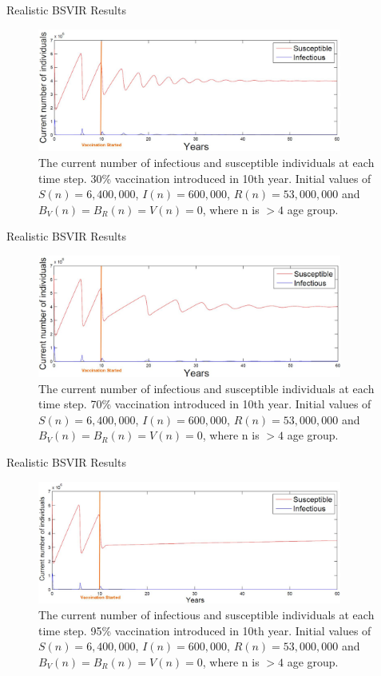 \documentclass{beamer}
\begin{document}
\begin{frame} {Realistic BSVIR} {Results}
\begin{figure}
\centering
\includegraphics[width=100mm]{figrealisticbsvir30.jpg}
\caption{The current number of infectious and susceptible individuals at each time step. 30\% vaccination introduced in 10th year. Initial values of $S\left( n \right) =6,400,000$, $I\left( n \right) =600,000$, $R\left( n \right) =53,000,000$ and $B_V\left( n \right) =B_R\left( n \right) =V\left( n \right) =0$, where n is $>4$ age group.}
\end{figure}
\end{frame}

\begin{frame} {Realistic BSVIR} {Results}
\begin{figure}
\centering
\includegraphics[width=100mm]{figrealisticbsvir70.jpg}
\caption{The current number of infectious and susceptible individuals at each time step. 70\% vaccination introduced in 10th year. Initial values of $S\left( n \right) =6,400,000$, $I\left( n \right) =600,000$, $R\left( n \right) =53,000,000$ and $B_V\left( n \right) =B_R\left( n \right) =V\left( n \right) =0$, where n is $>4$ age group.}
\end{figure}
\end{frame}

\begin{frame} {Realistic BSVIR} {Results}
\begin{figure}
\centering
\includegraphics[width=100mm]{figrealisticbsvir95.jpg}
\caption{The current number of infectious and susceptible individuals at each time step. 95\% vaccination introduced in 10th year. Initial values of $S\left( n \right) =6,400,000$, $I\left( n \right) =600,000$, $R\left( n \right) =53,000,000$ and $B_V\left( n \right) =B_R\left( n \right) =V\left( n \right) =0$, where n is $>4$ age group.}
\end{figure}
\end{frame}
\end{document}
